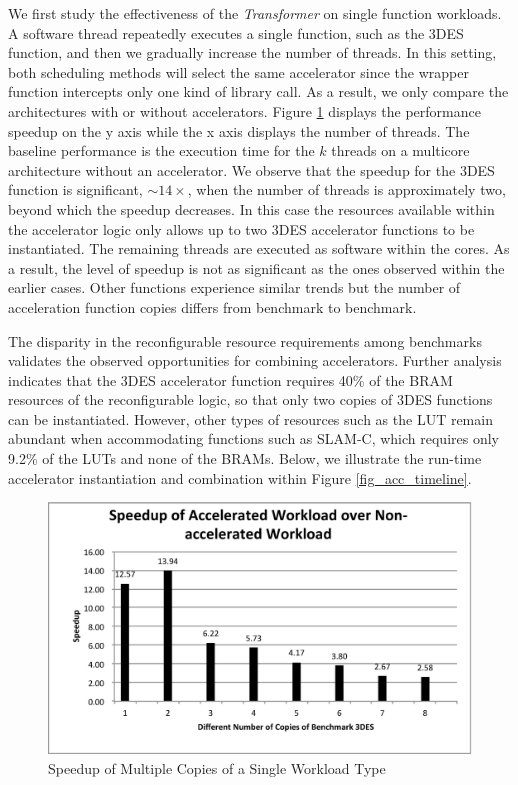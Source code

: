 We first study the effectiveness of the {\em Transformer} on single function 
workloads. A software thread repeatedly executes a single function, such as the 3DES function,
 and then we gradually increase the number of threads. In this setting, both 
scheduling methods will select the same accelerator since the wrapper function
intercepts only one kind of library call. As a result, we only compare the architectures with
or without accelerators. 
Figure \ref{fig_num_of_apps} displays the performance speedup on the y
axis while the x axis displays the number of threads. The
baseline performance is the execution time for the $k$ threads on a multicore
architecture without an accelerator. We 
observe that the speedup for the 3DES function is significant, $\sim14\times$, when the number of threads is
approximately two, beyond which the speedup decreases. In this case the
resources available within the accelerator logic only allows up to two
3DES accelerator functions to be instantiated. The remaining threads
are executed as software within the cores.  As a result, the level of speedup is not
as significant as the ones observed within the earlier cases.  Other functions
experience similar trends but the number of acceleration function
copies differs from benchmark to benchmark.   

The disparity in the reconfigurable resource requirements among benchmarks
validates the observed opportunities for combining accelerators. Further
analysis indicates that the 3DES accelerator function requires 40\% of 
the BRAM resources of the reconfigurable logic, so that only two copies of
3DES functions can be instantiated. However, other types of
resources such as the LUT remain abundant when accommodating
functions such as SLAM-C, which requires only 9.2\% of the LUTs and none of the
BRAMs. Below, we illustrate the run-time accelerator instantiation and combination within Figure
\ref{fig_acc_timeline}.   

\begin{figure}
    \centering
    \includegraphics[width=4.5in]{Increase-Num-of-Apps}
    \caption{Speedup of Multiple Copies of a Single Workload Type}
    \label{fig_num_of_apps}
\end{figure}

